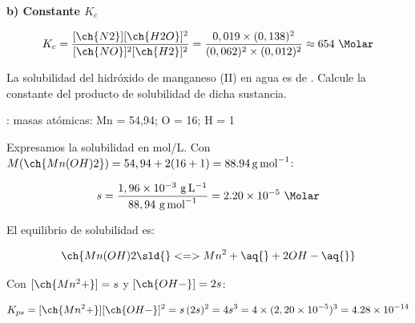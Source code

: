 \begin{exerciseEVAU}
\begin{solu}
        \textbf{b) Constante \(K_c\)}

        \begin{equation*}
            K_c = \dfrac{[\ch{N2}][\ch{H2O}]^2}{[\ch{NO}]^2[\ch{H2}]^2} = \dfrac{0,019 \times (0,138)^2}{(0,062)^2 \times (0,012)^2} \approx 654 \ \si{\per\Molar}
        \end{equation*}

    \end{solu}

\end{exerciseEVAU}

\begin{exerciseEVAU}
    La solubilidad del hidróxido de manganeso (II) en agua es de .
    Calcule la constante del producto de solubilidad de dicha sustancia.

    \datos{}: masas atómicas: Mn = 54,94; O = 16; H = 1


    \begin{solu}

        Expresamos la solubilidad en mol/L. Con \(M(\ch{Mn(OH)2}) = 54,94 + 2(16+1) = \SI{88.94}{\gram\per\mole}\):

        \begin{equation*}
            s = \dfrac{1,96 \times 10^{-3} \ \si{\gram\per\litre}}{88,94 \ \si{\gram\per\mole}} = \num{2.20e-5} \ \si{\Molar}
        \end{equation*}

        El equilibrio de solubilidad es:

        \begin{equation*}
            \ch{Mn(OH)2 \sld{} <=> Mn^2+ \aq{} + 2 OH- \aq{}}
        \end{equation*}

        Con \([\ch{Mn^2+}] = s\) y \([\ch{OH-}] = 2s\):

        \begin{equation*}
            K_{ps} = [\ch{Mn^2+}][\ch{OH-}]^2 = s\, (2s)^2 = 4 s^3 = 4 \times (2,20 \times 10^{-5})^3 = \num{4.28e-14}
        \end{equation*}

    \end{solu}

\end{exerciseEVAU}

